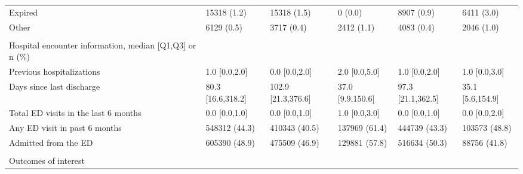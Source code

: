 \begin{adjustbox}{width={\textwidth},totalheight={\textheight},keepaspectratio,frame}
{\begin{tabular}{L{20em}C{10em}C{10em}C{10em}C{10em}C{10em}}
\hspace{3mm}                            Expired &        15318 (1.2) &                   15318 (1.5) &                   0 (0.0) &                     8907 (0.9) &                6411 (3.0) \\
\hspace{3mm}                              Other &         6129 (0.5) &                    3717 (0.4) &                2412 (1.1) &                     4083 (0.4) &                2046 (1.0) \\
&                 &                            &                        &                             &                        \\
Hospital encounter information, median [Q1,Q3] or n (\%) &                 &                            &                        &                             &                        \\
\hspace{3mm}          Previous hospitalizations &      1.0 [0.0,2.0] &                 0.0 [0.0,2.0] &             2.0 [0.0,5.0] &                  1.0 [0.0,2.0] &             1.0 [0.0,3.0] \\
\hspace{3mm}         Days since last discharge &  80.3 [16.6,318.2] &            102.9 [21.3,376.6] &          37.0 [9.9,150.6] &              97.3 [21.1,362.5] &          35.1 [5.6,154.9] \\
\hspace{3mm}          Total ED visits in the last 6 months &      0.0 [0.0,1.0] &                 0.0 [0.0,1.0] &             1.0 [0.0,3.0] &                  0.0 [0.0,1.0] &             0.0 [0.0,2.0] \\
\hspace{3mm} Any ED visit in past 6 months &      548312 (44.3) &                 410343 (40.5) &             137969 (61.4) &                  444739 (43.3) &             103573 (48.8) \\
\hspace{3mm}                  Admitted from the ED &      605390 (48.9) &                 475509 (46.9) &             129881 (57.8) &                  516634 (50.3) &              88756 (41.8) \\
&                 &                            &                        &                             &                        \\
Outcomes of interest &                 &                            &                        &                             &                        \\

\end{tabular}}
\end{adjustbox}
